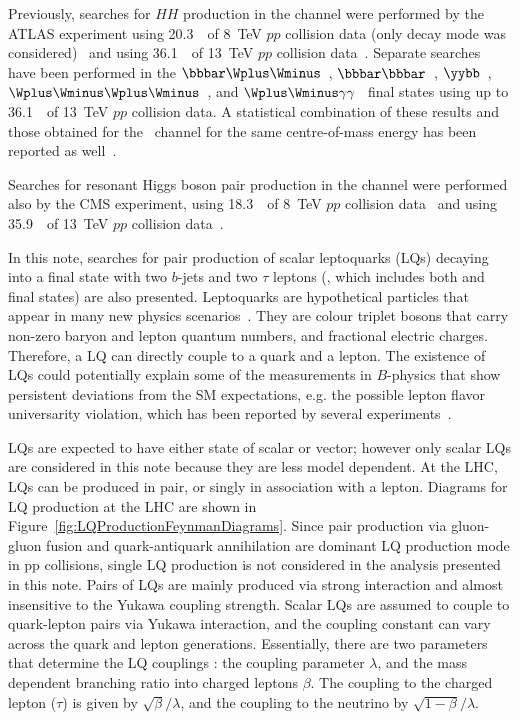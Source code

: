 Previously, searches for $HH$ production in the \bbtt channel were performed by the ATLAS experiment using 20.3~\ifb\ of
8~TeV $pp$ collision data (only \lephad decay mode was considered)~\cite{HIGG-2013-33} and using 36.1~\ifb\ of 13~TeV $pp$ collision data~\cite{HIGG-2016-16}. Separate searches have been performed in the $\bbbar\Wplus\Wminus$~\cite{HIGG-2016-27},
$\bbbar\bbbar$~\cite{EXOT-2016-31}, $\yybb$~\cite{HIGG-2016-15}, $\Wplus\Wminus\Wplus\Wminus$~\cite{HIGG-2016-24}, 
and $\Wplus\Wminus\gamma\gamma$~\cite{HIGG-2016-20} final states using up to 36.1~\ifb\ of 13~TeV $pp$ collision data. A statistical combination of these results and those obtained for the \bbtt\ channel for the same centre-of-mass energy has been reported as well~\cite{HDBS-2018-58}.

Searches for resonant Higgs boson pair production in the \bbtt channel were performed also by the CMS experiment, using 18.3~\ifb\ of 8~TeV $pp$ collision data~\cite{PhysRevD.96.072004} and using 35.9~\ifb\ of 13~TeV $pp$ collision data~\cite{Sirunyan:2017djm}.

In this note, searches for pair production of scalar leptoquarks (LQs) decaying into a final state with two $b$-jets and two $\tau$ leptons (\btbt, which includes both \bbartbt and \btbbart final states) are also presented. Leptoquarks are hypothetical particles that appear in many new physics scenarios~\cite{Pati:1974yy, Georgi:1974sy, Dimopoulos:1979es, Dimopoulos:1979sp, Eichten:1979ah, Angelopoulos:1986uq, Buchmuller:1986iq}. They are colour triplet bosons that carry non-zero baryon and lepton quantum numbers, and fractional electric charges. Therefore, a LQ can directly couple to a quark and a lepton. The existence of LQs could potentially explain some of the measurements in $B$-physics that show persistent  deviations from the SM expectations, e.g. the possible lepton flavor universarity violation, which has been reported by several experiments~\cite{Lees:2013uzd, Huschle:2015rga, PhysRevLett.115.159901, Aaij:2017vbb, Aaij:2019wad}.

LQs are expected to have either state of scalar or vector; however only scalar LQs are considered in this note because they are less model dependent. At the LHC, LQs can be produced in pair, or singly in association with a lepton. Diagrams for LQ production at the LHC are shown in Figure~\ref{fig:LQProductionFeynmanDiagrams}. Since pair production via gluon-gluon fusion and quark-antiquark annihilation are dominant LQ production mode in pp collisions, single LQ production is not considered in the analysis presented in this note. Pairs of LQs are mainly produced via strong interaction and almost insensitive to the Yukawa coupling strength. Scalar LQs are assumed to couple to quark-lepton pairs via Yukawa interaction, and the coupling constant can vary across the quark and lepton generations. Essentially, there are two parameters that determine the LQ couplings : the coupling parameter $\lambda$, and the mass dependent branching ratio into charged leptons $\beta$. The coupling to the charged lepton ($\tau$) is given by $\sqrt{\beta}/\lambda$, and the coupling to the neutrino by $\sqrt{1-\beta}/\lambda$.

